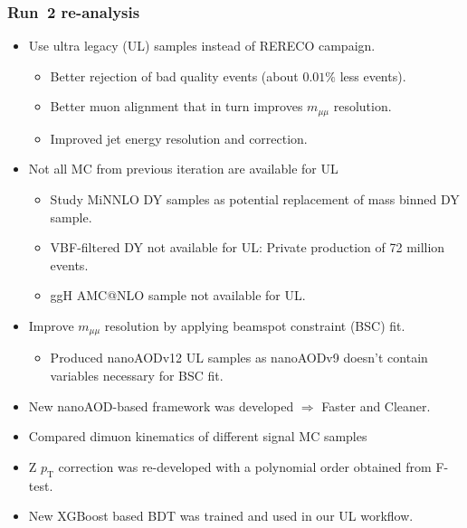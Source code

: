 \documentclass[dvipsnames,aspectratio=169]{beamer}
\begin{document}
\begin{frame}
    \frametitle{Run~2 re-analysis}
    \begin{itemize}
    \item Use ultra legacy (UL) samples instead of RERECO campaign.
    \begin{itemize}
    \item Better rejection of bad quality events (about $0.01\%$ less events).
    \item Better muon alignment that in turn improves $m_{\mu\mu}$ resolution.
    \item Improved jet energy resolution and correction.
    \end{itemize}
    \item Not all MC from previous iteration are available for UL
    \begin{itemize}
    \item Study MiNNLO DY samples as potential replacement of mass binned DY sample.
    \item VBF-filtered DY not available for UL: Private production of 72 million events.
    \item ggH AMC@NLO sample not available for UL.
    \end{itemize}
    \item Improve $m_{\mu\mu}$ resolution by applying beamspot constraint (BSC) fit.
    \begin{itemize}
    \item Produced nanoAODv12 UL samples as nanoAODv9 doesn't contain variables necessary for BSC fit.
    \end{itemize}
    \item New nanoAOD-based framework was developed $\Rightarrow$ Faster and Cleaner.
    \item Compared dimuon kinematics of different signal MC samples
    \item Z $p_\mathrm{T}$ correction was re-developed with a polynomial order obtained from F-test.
    \item New XGBoost based BDT was trained and used in our UL workflow.
    \end{itemize}
\end{frame}

\end{document}
